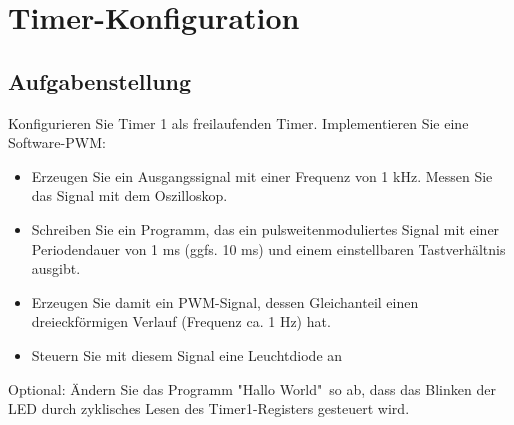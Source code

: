 \section{Timer-Konfiguration}
\label{sec:Timer-Konfiguration} %
\subsection{Aufgabenstellung}
Konfigurieren Sie Timer 1 als freilaufenden Timer. Implementieren Sie eine Software-PWM:
\begin{itemize}
	\item Erzeugen Sie ein Ausgangssignal mit einer Frequenz von 1 kHz. Messen Sie das Signal mit dem Oszilloskop.
	\item Schreiben Sie ein Programm, das ein pulsweitenmoduliertes Signal mit einer Periodendauer von 1 ms (ggfs. 10 ms) und einem einstellbaren Tastverhältnis ausgibt.
	\item Erzeugen Sie damit ein PWM-Signal, dessen Gleichanteil einen dreieckförmigen Verlauf (Frequenz ca. 1 Hz) hat.
	\item Steuern Sie mit diesem Signal eine Leuchtdiode an
\end{itemize}
Optional: Ändern Sie das Programm "Hallo World"\ so ab, dass das Blinken der LED durch zyklisches Lesen des Timer1-Registers gesteuert wird.


